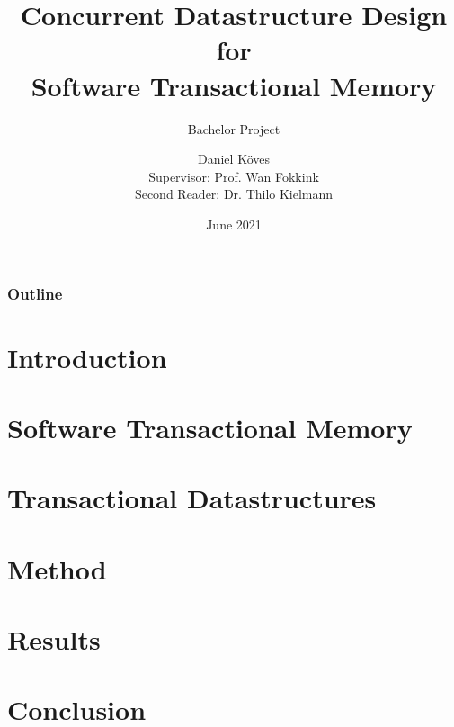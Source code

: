 \documentclass{beamer}
\title{Concurrent Datastructure Design for \\Software Transactional Memory}
\subtitle{Bachelor Project}
\author{
    Daniel Köves\\
    \vspace*{0.3cm}
    \scriptsize{Supervisor: Prof. Wan Fokkink}\\
    \scriptsize{Second Reader: Dr. Thilo Kielmann}
}
\institute{Vrije Universiteit Amsterdam}
\date{June 2021}
\begin{document}
\frame{\titlepage}

\begin{frame}
\frametitle{Outline}
\tableofcontents
\end{frame}

\section{Introduction}


\section{Software Transactional Memory}


\section{Transactional Datastructures}


\section{Method}


\section{Results}


\section{Conclusion}

\end{document}
